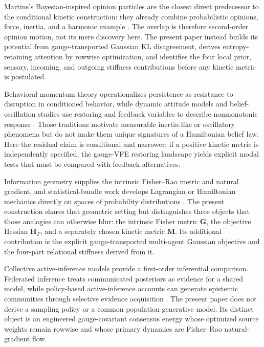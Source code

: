 \documentclass[12pt]{article}
\begin{document}
Martins's Bayesian-inspired opinion particles are the closest direct predecessor to the conditional kinetic construction: they already combine probabilistic opinions, force, inertia, and a harmonic example \citep{Martins2015OpinionParticles}. The overlap is therefore second-order opinion motion, not its mere discovery here. The present paper instead builds its potential from gauge-transported Gaussian KL disagreement, derives entropy-retaining attention by rowwise optimization, and identifies the four local prior, sensory, incoming, and outgoing stiffness contributions before any kinetic metric is postulated.

Behavioral momentum theory operationalizes persistence as resistance to disruption in conditioned behavior, while dynamic attitude models and belief-oscillation studies use restoring and feedback variables to describe nonmonotonic response \citep{NevinMandellAtak1983,kaplowitz1983,kaplowitz1992,fink2002}. Those traditions motivate measurable inertia-like or oscillatory phenomena but do not make them unique signatures of a Hamiltonian belief law. Here the residual claim is conditional and narrower: if a positive kinetic metric is independently specified, the gauge-VFE restoring landscape yields explicit modal tests that must be compared with feedback alternatives.

Information geometry supplies the intrinsic Fisher--Rao metric and natural gradient, and statistical-bundle work develops Lagrangian or Hamiltonian mechanics directly on spaces of probability distributions \citep{Pistone2018StatisticalBundle,ChircoMalagoPistone2022,LeokZhang2017,GirolamiCalderhead2011}. The present construction shares that geometric setting but distinguishes three objects that those analogies can otherwise blur: the intrinsic Fisher metric $\mathbf G$, the objective Hessian $\mathbf H_F$, and a separately chosen kinetic metric $\mathbf M$. Its additional contribution is the explicit gauge-transported multi-agent Gaussian objective and the four-part relational stiffness derived from it.

Collective active-inference models provide a first-order inferential comparison. Federated inference treats communicated posteriors as evidence for a shared model, while policy-based active-inference accounts can generate epistemic communities through selective evidence acquisition \citep{friston2024federated,albarracin2022epistemic}. The present paper does not derive a sampling policy or a common population generative model. Its distinct object is an engineered gauge-covariant consensus energy whose optimized source weights remain rowwise and whose primary dynamics are Fisher--Rao natural-gradient flow.
\end{document}
